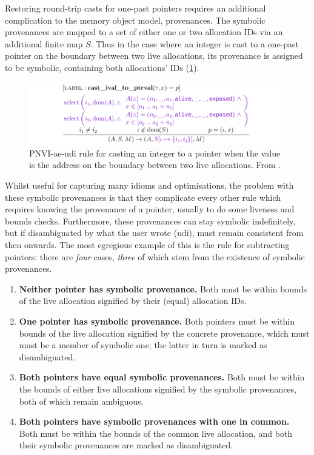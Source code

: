 Restoring round-trip casts for one-past pointers requires an additional
complication to the memory object model,  provenances. The
symbolic provenances are mapped to a set of either one or two allocation IDs
via an additional finite map $\mathit{S}$. Thus in the case where an integer
is cast to a one-past pointer on the boundary between two live allocations, its
provenance is assigned to be symbolic, containing both allocations' IDs
(\cref{fig:pnvi-ival-to-pval-symbolic}).

\begin{figure}
    \includegraphics{figures/mem-model-pnvi-ival-to-pval-symbolic}
    \caption{PNVI-ae-udi rule for casting an integer to a pointer when
        the value is the address on the boundary between two live allocations.
        From \textcite{memarian2022cerberus}.}\label{fig:pnvi-ival-to-pval-symbolic}
\end{figure}

Whilst useful for capturing many idioms and optimisations, the problem with these
symbolic provenances is that they complicate every other rule which requires
knowing the provenance of a pointer, usually to do some liveness and bounds checks.
Furthermore, these provenances can stay symbolic indefinitely, but if disambiguated
by what the user wrote (udi), must remain consistent from then onwards. The
most egregious example of this is the rule for subtracting pointers: there
are \emph{four} cases, \emph{three} of which stem from the existence of symbolic
provenances.
\begin{enumerate}
    \item \textbf{Neither pointer has symbolic provenance.} Both must be within
        bounds of the live allocation signified by their (equal) allocation
        IDs.
    \item \textbf{One pointer has symbolic provenance.} Both pointers must be
        within bounds of the live allocation signified by the concrete
        provenance, which must must be a member of symbolic one; the latter in
        turn is marked as disambiguated.
    \item \textbf{Both pointers have equal symbolic provenances.} Both must
        be within the bounds of either live allocations signified by the
        symbolic provenances, both of which remain ambiguous.
    \item \textbf{Both pointers have symbolic provenances with one in common.}
        Both must be within the bounds of the common live allocation, and
        both their symbolic provenances are marked as disambiguated.
\end{enumerate}

